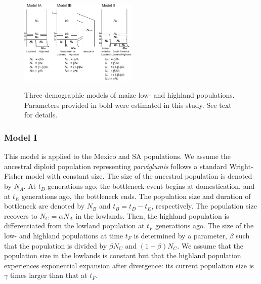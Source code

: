 \begin{figure}[tb]   
  \begin{center}
   \vspace{-0mm}
   \includegraphics[width=0.5\textwidth]{fig/Fig3}
   \renewcommand{\baselinestretch}{0.9}
   \vspace{-3mm}
   \caption{Three demographic models of maize low- and highland populations.  Parameters provided in bold were estimated in this study.  See text for details.
   }
\vspace{-6mm}
    \label{model}
  \end{center}
\end{figure}

\subsubsection{Model I}
This model is applied to the Mexico and SA populations.
We assume the ancestral diploid population representing \emph{parviglumis} follows a standard Wright-Fisher model with constant size.  The size of the ancestral population is denoted by $N_A$.
At $t_D$ generations ago, the bottleneck event begins at domestication, and at $t_E$ generations ago, the bottleneck ends.  The population size and duration of bottleneck are denoted by $N_B$ and $t_B=t_D-t_E$, respectively.  The population size recovers to $N_C=\alpha N_A$ in the lowlands.  
Then, the highland population is differentiated from the lowland population at $t_F$ generations ago.  The size of the low- and highland populations at time $t_F$ is determined by a parameter, $\beta$ such that the population is divided by $\beta N_C$ and $(1-\beta)N_C$.  
We assume that the population size in the lowlands is constant but that the highland population experiences exponential expansion after divergence: its current population size is $\gamma$ times larger than that at $t_F$.  \\

